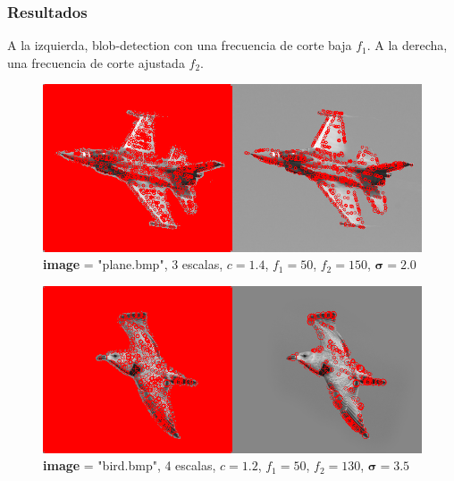 \documentclass{article}
\begin{document}
\subsubsection{Resultados}
A la izquierda, blob-detection con una frecuencia de corte baja $f_1$. A la derecha, una frecuencia de corte ajustada $f_2$.
\begin{figure}[hbt!]
	\centering
	\includegraphics[width=1.\textwidth]{assets/ex1-A/s2_5-t1_4-l3-50-150.png}
	\caption{\textbf{image} = "plane.bmp", 3 escalas, $c=1.4$, $f_1=50$, $f_2=150$, $\boldsymbol{\sigma} = 2.0$}
\end{figure}
\begin{figure}[hbt!]
	\centering
	\includegraphics[width=1.\textwidth]{assets/ex1-A/s_3_5-t1_2-l3-50-130.png}
	\caption{\textbf{image} = "bird.bmp", 4 escalas, $c=1.2$, $f_1=50$, $f_2=130$, $\boldsymbol{\sigma} = 3.5$}
\end{figure}

\newpage
\end{document}
